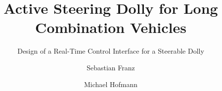 \documentclass[masters,a4paper,12pt]{chalmers-thesis}
\title{Active Steering Dolly for Long Combination Vehicles}
\subtitle{Design of a Real-Time Control Interface for a Steerable Dolly} %
\author{Sebastian Franz\and Michael Hofmann}
\begin{document}
\maketitle









%









\clearpage
\nocite{*} %
\printbibliography %
%
%
%
\end{document}
